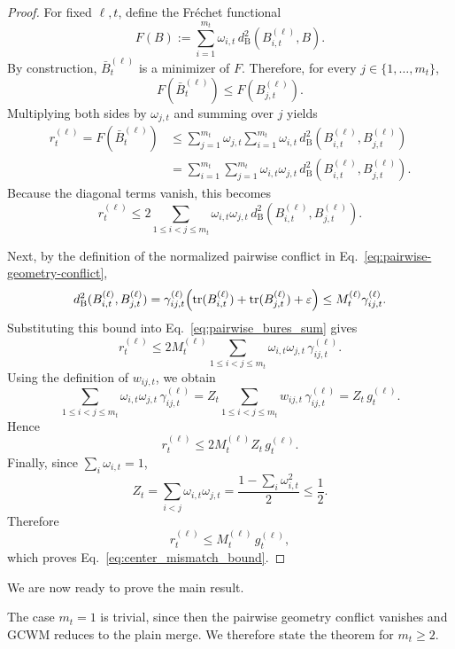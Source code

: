 \documentclass{article}
\begin{document}
\begin{proof}
For fixed \(\ell,t\), define the Fr\'echet functional
\[
F(B)
:=
\sum_{i=1}^{m_t}\omega_{i,t}\,
d_{\mathrm B}^2(B_{i,t}^{(\ell)},B).
\]
By construction, \(\bar B_t^{(\ell)}\) is a minimizer of \(F\). Therefore, for every \(j\in\{1,\dots,m_t\}\),
\[
F(\bar B_t^{(\ell)})
\le
F(B_{j,t}^{(\ell)}).
\]
Multiplying both sides by \(\omega_{j,t}\) and summing over \(j\) yields
\begin{align}
r_t^{(\ell)}
=
F(\bar B_t^{(\ell)})
&\le
\sum_{j=1}^{m_t}\omega_{j,t}
\sum_{i=1}^{m_t}\omega_{i,t}\,
d_{\mathrm B}^2(B_{i,t}^{(\ell)},B_{j,t}^{(\ell)})
\nonumber\\
&=
\sum_{i=1}^{m_t}\sum_{j=1}^{m_t}
\omega_{i,t}\omega_{j,t}\,
d_{\mathrm B}^2(B_{i,t}^{(\ell)},B_{j,t}^{(\ell)}).
\label{eq:barycenter_variance_bound}
\end{align}
Because the diagonal terms vanish, this becomes
\begin{equation}
r_t^{(\ell)}
\le
2\sum_{1\le i<j\le m_t}
\omega_{i,t}\omega_{j,t}\,
d_{\mathrm B}^2(B_{i,t}^{(\ell)},B_{j,t}^{(\ell)}).
\label{eq:pairwise_bures_sum}
\end{equation}

Next, by the definition of the normalized pairwise conflict in Eq.~\eqref{eq:pairwise-geometry-conflict},
\[
d_{\mathrm B}^2(B_{i,t}^{(\ell)},B_{j,t}^{(\ell)})
=
\gamma_{ij,t}^{(\ell)}
\Bigl(
\mathrm{tr}(B_{i,t}^{(\ell)})+\mathrm{tr}(B_{j,t}^{(\ell)})+\varepsilon
\Bigr)
\le
M_t^{(\ell)}\gamma_{ij,t}^{(\ell)}.
\]
Substituting this bound into Eq.~\eqref{eq:pairwise_bures_sum} gives
\begin{equation}
r_t^{(\ell)}
\le
2M_t^{(\ell)}
\sum_{1\le i<j\le m_t}
\omega_{i,t}\omega_{j,t}\,
\gamma_{ij,t}^{(\ell)}.
\label{eq:pairwise_gamma_bound}
\end{equation}
Using the definition of \(w_{ij,t}\), we obtain
\[
\sum_{1\le i<j\le m_t}
\omega_{i,t}\omega_{j,t}\,
\gamma_{ij,t}^{(\ell)}
=
Z_t \sum_{1\le i<j\le m_t}
w_{ij,t}\,\gamma_{ij,t}^{(\ell)}
=
Z_t\, g_t^{(\ell)}.
\]
Hence
\[
r_t^{(\ell)}
\le
2M_t^{(\ell)} Z_t\, g_t^{(\ell)}.
\]
Finally, since \(\sum_i \omega_{i,t}=1\),
\[
Z_t
=
\sum_{i<j}\omega_{i,t}\omega_{j,t}
=
\frac{1-\sum_i \omega_{i,t}^2}{2}
\le
\frac12.
\]
Therefore
\[
r_t^{(\ell)}
\le
M_t^{(\ell)}\, g_t^{(\ell)},
\]
which proves Eq.~\eqref{eq:center_mismatch_bound}.
\end{proof}

We are now ready to prove the main result.

The case \(m_t=1\) is trivial, since then the pairwise geometry conflict vanishes and GCWM reduces to the plain merge. We therefore state the theorem for \(m_t \ge 2\).
\end{document}
